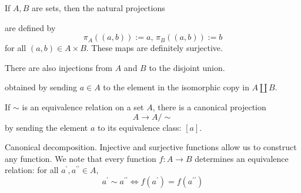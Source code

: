 \documentclass{report}
\begin{document}
\begin{examples}
    \begin{example}[\label{exm:1.2.4}]
        If $A, B$ are sets, then the natural projections 
            \begin{center}
            \end{center}
        are defined by
        \begin{equation*}
            \pi_{A}((a, b)) := a, \, \pi_{B}((a, b)) := b
        \end{equation*}
        for all $(a, b) \in A \times B$. These maps are definitely surjective.
    \end{example}

    \begin{example}[\label{exm:1.2.5}]
        There are also injections from $A$ and $B$ to the disjoint union.
        \begin{center}
        \end{center}
        obtained by sending $a \in A$ to the element in the isomorphic copy in $A \coprod B$.
    \end{example}

    \begin{example}[\label{exm:1.2.6}]
        If $\sim $ is an equivalence relation on a set $A$, there is a canonical projection
        \begin{equation*}
            A \rightarrow A / \sim 
        \end{equation*}
        by sending the element $a$ to its equivalence class: $[a]$.
    \end{example}

    \begin{example}[\label{exm:1.2.7}]
        Canonical decomposition. Injective and surjective functions allow us to construct any function. We note that every function $f : A \rightarrow B$ determines an equivalence relation: for all $a^{\prime}, a^{\prime\prime} \in A$,
        \begin{equation*}
            a^{\prime} \sim a^{\prime\prime} \iff f(a^{\prime}) = f(a^{\prime\prime})
        \end{equation*}
    \end{example}
\end{examples}
\end{document}
